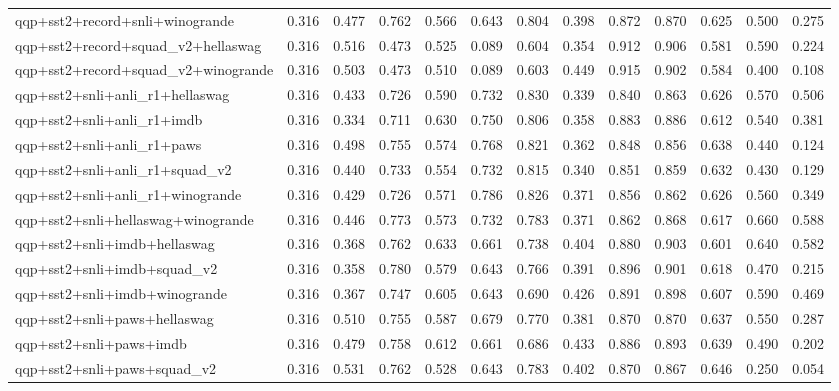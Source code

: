 \begin{table}[t]
\begin{tabular}{lrrrrrrrrrrrr}
    qqp+sst2+record+snli+winogrande & 0.316 & 0.477 & 0.762 & 0.566 & 0.643 & 0.804 & 0.398 & 0.872 & 0.870 & 0.625 & 0.500 & 0.275 \\
    qqp+sst2+record+squad\_v2+hellaswag & 0.316 & 0.516 & 0.473 & 0.525 & 0.089 & 0.604 & 0.354 & 0.912 & 0.906 & 0.581 & 0.590 & 0.224 \\
    qqp+sst2+record+squad\_v2+winogrande & 0.316 & 0.503 & 0.473 & 0.510 & 0.089 & 0.603 & 0.449 & 0.915 & 0.902 & 0.584 & 0.400 & 0.108 \\
    qqp+sst2+snli+anli\_r1+hellaswag & 0.316 & 0.433 & 0.726 & 0.590 & 0.732 & 0.830 & 0.339 & 0.840 & 0.863 & 0.626 & 0.570 & 0.506 \\
    qqp+sst2+snli+anli\_r1+imdb & 0.316 & 0.334 & 0.711 & 0.630 & 0.750 & 0.806 & 0.358 & 0.883 & 0.886 & 0.612 & 0.540 & 0.381 \\
    qqp+sst2+snli+anli\_r1+paws & 0.316 & 0.498 & 0.755 & 0.574 & 0.768 & 0.821 & 0.362 & 0.848 & 0.856 & 0.638 & 0.440 & 0.124 \\
    qqp+sst2+snli+anli\_r1+squad\_v2 & 0.316 & 0.440 & 0.733 & 0.554 & 0.732 & 0.815 & 0.340 & 0.851 & 0.859 & 0.632 & 0.430 & 0.129 \\
    qqp+sst2+snli+anli\_r1+winogrande & 0.316 & 0.429 & 0.726 & 0.571 & 0.786 & 0.826 & 0.371 & 0.856 & 0.862 & 0.626 & 0.560 & 0.349 \\
    qqp+sst2+snli+hellaswag+winogrande & 0.316 & 0.446 & 0.773 & 0.573 & 0.732 & 0.783 & 0.371 & 0.862 & 0.868 & 0.617 & 0.660 & 0.588 \\
    qqp+sst2+snli+imdb+hellaswag & 0.316 & 0.368 & 0.762 & 0.633 & 0.661 & 0.738 & 0.404 & 0.880 & 0.903 & 0.601 & 0.640 & 0.582 \\
    qqp+sst2+snli+imdb+squad\_v2 & 0.316 & 0.358 & 0.780 & 0.579 & 0.643 & 0.766 & 0.391 & 0.896 & 0.901 & 0.618 & 0.470 & 0.215 \\
    qqp+sst2+snli+imdb+winogrande & 0.316 & 0.367 & 0.747 & 0.605 & 0.643 & 0.690 & 0.426 & 0.891 & 0.898 & 0.607 & 0.590 & 0.469 \\
    qqp+sst2+snli+paws+hellaswag & 0.316 & 0.510 & 0.755 & 0.587 & 0.679 & 0.770 & 0.381 & 0.870 & 0.870 & 0.637 & 0.550 & 0.287 \\
    qqp+sst2+snli+paws+imdb & 0.316 & 0.479 & 0.758 & 0.612 & 0.661 & 0.686 & 0.433 & 0.886 & 0.893 & 0.639 & 0.490 & 0.202 \\
    qqp+sst2+snli+paws+squad\_v2 & 0.316 & 0.531 & 0.762 & 0.528 & 0.643 & 0.783 & 0.402 & 0.870 & 0.867 & 0.646 & 0.250 & 0.054 \\

\end{tabular}
\end{table}
